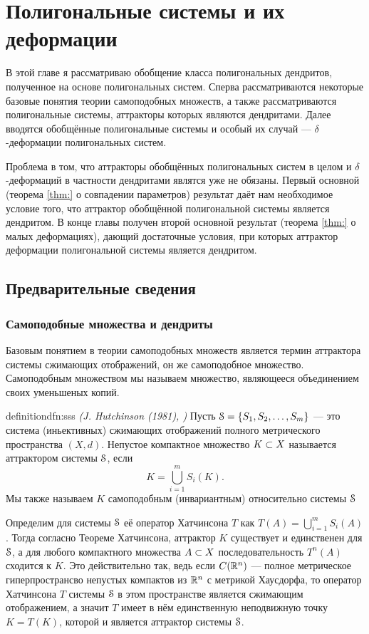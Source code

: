 \chapter{Полигональные системы и их деформации}

В этой главе я рассматриваю обобщение класса полигональных дендритов, полученное на основе полигональных систем.
Сперва рассматриваются некоторые базовые понятия теории самоподобных множеств, а также рассматриваются полигональные системы, аттракторы которых являются дендритами.
Далее вводятся обобщённые полигональные системы и особый их случай --- $\delta$-деформации полигональных систем.

Проблема в том, что аттракторы обобщённых полигональных систем в целом и $\delta$-деформаций в частности дендритами являтся уже не обязаны.
Первый основной (теорема \ref{thm:} о совпадении параметров) результат даёт нам необходимое условие того, что аттрактор обобщённой полигональной системы является дендритом.
В конце главы  получен второй основной результат (теорема \ref{thm:} о малых деформациях), дающий достаточные условия, при которых аттрактор деформации полигональной системы является дендритом.


\section{Предварительные сведения}


\subsection{Самоподобные множества и дендриты}

Базовым понятием в теории самоподобных множеств является термин аттрактора системы сжимающих отображений, он же самоподобное множество.
Самоподобным множеством мы называем множество, являющееся объединением своих уменьшеных копий.

\begin{restatethis}{definition}{dfn:sss} %
{\em (J. Hutchinson (1981), \cite{Hut1981})} 
Пусть ${\EuScript S}=\{S_1, S_2, \ldots, S_m\}$ --- это система (иньективных) сжимающих отображений полного метрического пространства $(X, d)$.
Непустое компактное множество $K\subset X$ называется аттрактором системы ${\EuScript S}$, если 
$$K = \bigcup \limits_{i=1}^m S_i (K).$$
Мы также называем $K$ самоподобным (инвариантным) относительно системы ${\EuScript S}$
\end{restatethis} 

Определим для системы ${\EuScript S}$ её оператор Хатчинсона $T$ как $T(A) = \bigcup \limits_{i = 1}^m S_i (A)$.
Тогда согласно Теореме Хатчинсона, аттрактор $K$ существует и единственен для ${\EuScript S}$, а для любого компактного множества $A\subset X$ последовательность $T^n (A)$ сходится к $K$.
Это действительно так, ведь если $C(\mathbb{R}^n)$ --- полное метрическое гиперпространсво непустых компактов из $\mathbb{R}^n$ с метрикой Хаусдорфа, то оператор Хатчинсона $T$ системы ${\EuScript S}$ в этом пространстве является сжимающим отображением, а значит $T$ имеет в нём единственную неподвижную точку $K=T(K)$, которой и является аттрактор системы ${\EuScript S}$.\\

